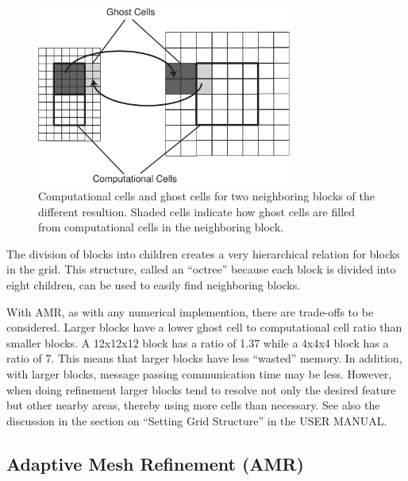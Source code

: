 \begin{figure}
\begin{center}
\includegraphics*[width=8.4cm]{message_pass_res_change.pdf}
\end{center}
\caption{Computational cells and ghost cells for two
neighboring blocks of the different resultion.  Shaded cells indicate
how ghost cells are filled from computational cells in the neighboring block.}
\label{fig:message_pass_res_change}
\end{figure}

The division of blocks into children creates a very hierarchical
relation for blocks in the grid.  This structure, called an ``octree''
because each block is divided into eight children, can be used to
easily find neighboring blocks.

With AMR, as with any numerical implemention, there are trade-offs to
be considered.  Larger blocks have a lower ghost cell
to computational cell ratio than smaller blocks.  A 12x12x12 block has
a ratio of 1.37 while a 4x4x4 block has a ratio of 7.  This means that 
larger blocks have less ``wasted'' memory.  In addition, 
with larger blocks, message passing communication time may be less.
However, when doing
refinement larger blocks tend to resolve not only the desired feature
but other nearby areas, thereby using more cells than necessary.
See also the discussion in the section on ``Setting Grid Structure''
in the USER MANUAL.


\subsection{Adaptive Mesh Refinement (AMR) \label{sectio:amr}}

